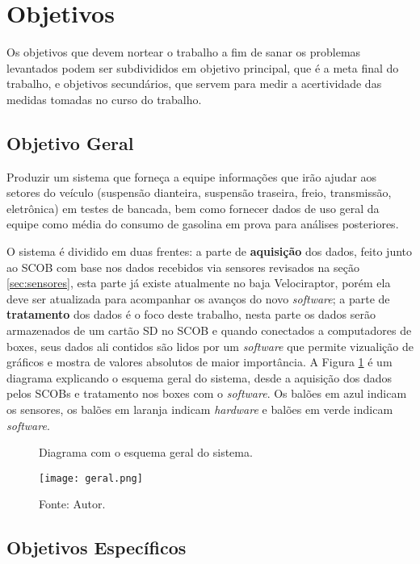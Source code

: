 \section{Objetivos}

Os objetivos que devem nortear o trabalho a fim de sanar os problemas levantados podem ser subdivididos em objetivo principal, que é a meta final do trabalho, e objetivos secundários, que servem para medir a acertividade das medidas tomadas no curso do trabalho.

\subsection{Objetivo Geral}

Produzir um sistema que forneça a equipe informações que irão ajudar aos setores do veículo (suspensão dianteira, suspensão traseira, freio, transmissão, eletrônica) em testes de bancada, bem como fornecer dados de uso geral da equipe como média do consumo de gasolina em prova para análises posteriores. 

O sistema é dividido em duas frentes: a parte de \textbf{aquisição} dos dados, feito junto ao SCOB com base nos dados recebidos via sensores revisados na seção \ref{sec:sensores}, esta parte já existe atualmente no baja Velociraptor, porém ela deve ser atualizada para acompanhar os avanços do novo \textit{software}; a parte de \textbf{tratamento} dos dados é o foco deste trabalho, nesta parte os dados serão armazenados de um cartão SD no SCOB e quando conectados a computadores de boxes, seus dados ali contidos são lidos por um \textit{software} que permite vizualição de gráficos e mostra de valores absolutos de maior importância. A Figura \ref{fig:geral} é um diagrama explicando o esquema geral do sistema, desde a aquisição dos dados pelos SCOBs e tratamento nos boxes com o \textit{software}. Os balões em azul indicam os sensores, os balões em laranja indicam \textit{hardware} e balões em verde indicam \textit{software}.         

\begin{figure}[!htb]
	\centering
		\caption{Diagrama com o esquema geral do sistema.}
		\texttt{[image: geral.png]} 
		\caption*{Fonte: Autor.}
		\label{fig:geral}
\end{figure} 


\subsection{Objetivos Específicos} 

